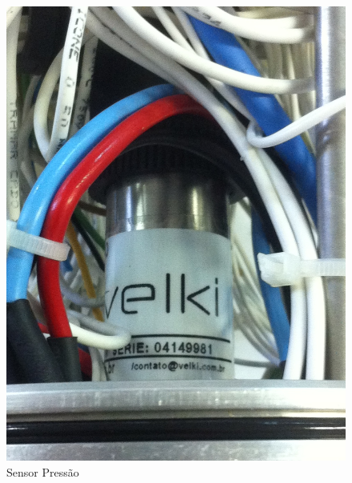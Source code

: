 \begin{figure}[h!]
 \centering
 \includegraphics[width=1\columnwidth]{Pressao/foto}
 \caption{Sensor Pressão}
\end{figure}


